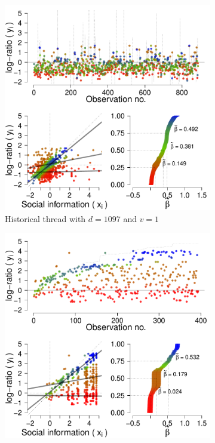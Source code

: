 \documentclass[a4paper,12pt]{article}
\begin{document}
\begin{figure}[!ht]
	\centering
	\begin{subfigure}[t]{.44\linewidth}
		\centering
		\includegraphics[width=1\linewidth]{h10971.pdf}
		\caption{\footnotesize Historical thread with $d=1097$ and $v=1$}
		\label{fig: h d=1097, v=1}
	\end{subfigure}
	\begin{subfigure}[t]{.44\linewidth}
		\centering
		\includegraphics[width=1\linewidth]{m10979.pdf}

\end{subfigure}
\end{figure}
\end{document}
